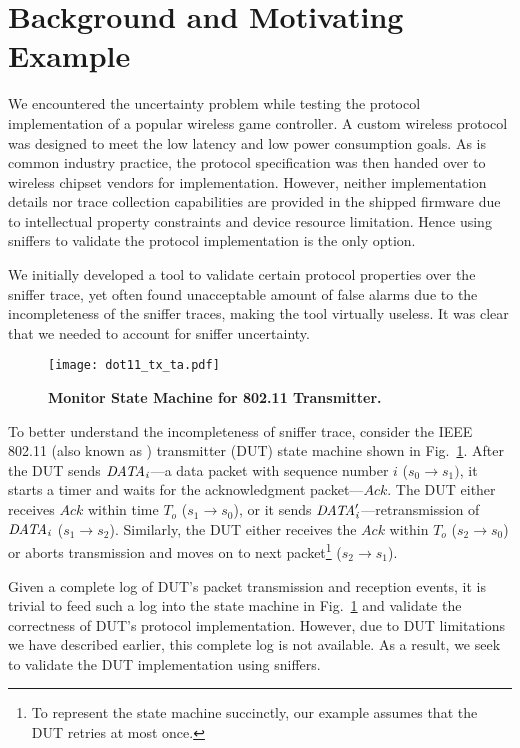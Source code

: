 \section{Background and Motivating Example}
\label{sec:motivation}

We encountered the uncertainty problem while testing the protocol implementation
of a popular wireless game controller. A custom wireless protocol
was designed to meet the low latency and low power consumption goals. As is
common industry practice, the protocol specification was then handed over to
wireless chipset vendors for implementation. However, neither implementation
details nor trace collection capabilities are provided in the shipped firmware
due to intellectual property constraints and device resource limitation. Hence
using sniffers to validate the protocol implementation is the only option.

We initially developed a tool to validate certain protocol properties over the
sniffer trace, yet often found unacceptable amount of false alarms due to
the incompleteness of the sniffer traces, making the tool virtually useless. It
was clear that we needed to account for sniffer uncertainty.

\begin{figure}[t!]
  \centering
  \texttt{[image: dot11\_tx\_ta.pdf]}
  \caption{\textbf{Monitor State Machine for 802.11 Transmitter.}}
  \label{fig:dot11_tx_ta}
\end{figure}


To better understand the incompleteness of sniffer trace, consider the IEEE
802.11 (also known as \wifi{}) transmitter (DUT) state machine shown in
Fig.~\ref{fig:dot11_tx_ta}. After the DUT sends $\it{DATA}_i$---a data packet with
sequence number $i$ ($s_0\rightarrow s_1)$, it starts a timer and waits for the
acknowledgment packet---$Ack$. The DUT either receives $Ack$ within time $T_o$
($s_1\rightarrow s_0$), or it sends $\it{DATA}'_i$---retransmission of $\it{DATA}_i$
($s_1\rightarrow s_2$). Similarly, the DUT either receives the $Ack$ within $T_o$
($s_2\rightarrow s_0$) or aborts transmission and moves on to next
packet\footnote{To represent the state machine succinctly, our example assumes
that the DUT retries at most once.} ($s_2\rightarrow s_1$).


Given a complete log of DUT's packet transmission and reception events, it is
trivial to feed such a log into the state machine in Fig.~\ref{fig:dot11_tx_ta}
and validate the correctness of DUT's protocol implementation. However, due to
DUT limitations we have described earlier, this complete log is not
available. As a result, we seek to validate the DUT implementation using
sniffers.

